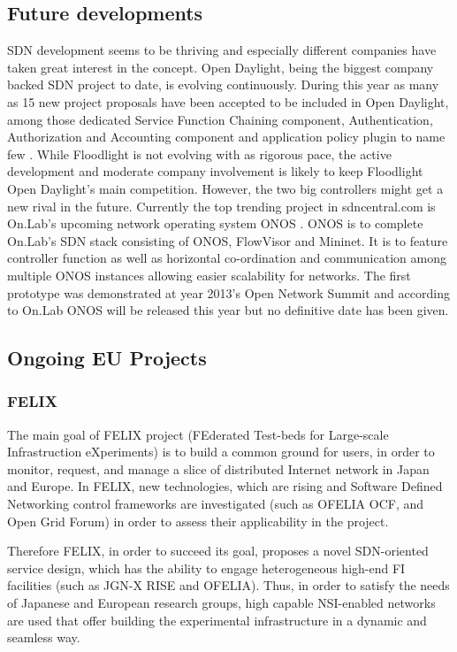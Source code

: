 \subsection{Future developments}

SDN development seems to be thriving and especially different companies have taken great interest in the concept. Open Daylight, being the biggest company backed SDN project to date, is evolving continuously. During this year as many as 15 new project proposals have been accepted to be included in Open Daylight, among those dedicated Service Function Chaining component, Authentication, Authorization and Accounting component and application policy plugin to name few \cite{projects}. While Floodlight is not evolving with as rigorous pace, the active development and moderate company involvement is likely to keep Floodlight Open Daylight's main competition. However, the two big controllers might get a new rival in the future. Currently the top trending project in sdncentral.com is On.Lab's upcoming network operating system ONOS \cite{SDNCentral, ONOS}. ONOS is to complete On.Lab's SDN stack consisting of ONOS, FlowVisor and Mininet. It is to feature controller function as well as horizontal co-ordination and communication among multiple ONOS instances allowing easier scalability for networks. The first prototype was demonstrated at year 2013's Open Network Summit and according to On.Lab ONOS will be released this year but no definitive date has been given.

\subsection{Ongoing EU Projects}
\subsubsection{FELIX}

The main goal of FELIX project (FEderated Test-beds for Large-scale Infrastruction eXperiments) is to build a common ground for users, in order to monitor, request, and manage a slice of distributed Internet network in Japan and Europe. In FELIX, new technologies, which are rising and Software Defined Networking control frameworks are investigated (such as OFELIA OCF, and Open Grid Forum) in order to assess their applicability in the project. \cite{FELIXproject}

Therefore FELIX, in order to succeed its goal, proposes a novel SDN-oriented service design, which has the ability to engage heterogeneous high-end FI facilities (such as JGN-X RISE and OFELIA). Thus, in order to satisfy the needs of Japanese and European research groups, high capable NSI-enabled networks are used that offer building the experimental infrastructure in a dynamic and seamless way. 

